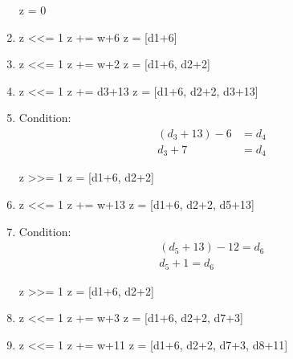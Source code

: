 \documentclass{article}
\begin{document}
\begin{enumerate}
\begin{snippet}[py]
z = 0
\end{snippet}

\item{}
\begin{snippet}[py]
z <<= 1
z += w+6
z = [d1+6]
\end{snippet}

\item{}
\begin{snippet}[py]
z <<= 1
z += w+2
z = [d1+6, d2+2]
\end{snippet}

\item{}
\begin{snippet}[py]
z <<= 1
z += d3+13
z = [d1+6, d2+2, d3+13]
\end{snippet}

\item{}

Condition: 
\begin{align*}
(d_3 + 13) - 6 &= d_4 \\
d_3 + 7 &= d_4
\end{align*}
\begin{snippet}[py]
z >>= 1
z = [d1+6, d2+2]
\end{snippet}

\item{}
\begin{snippet}[py]
z <<= 1
z += w+13
z = [d1+6, d2+2, d5+13]
\end{snippet}

\item{}

Condition: 
\begin{align*}
(d_5 + 13) - 12 = d_6 \\
d_5 + 1 = d_6
\end{align*}
\begin{snippet}[py]
z >>= 1
z = [d1+6, d2+2]
\end{snippet}

\item{}
\begin{snippet}[py]
z <<= 1
z += w+3
z = [d1+6, d2+2, d7+3]
\end{snippet}

\item{}
\begin{snippet}[py]
z <<= 1
z += w+11
z = [d1+6, d2+2, d7+3, d8+11]
\end{snippet}


\end{enumerate}
\end{document}
